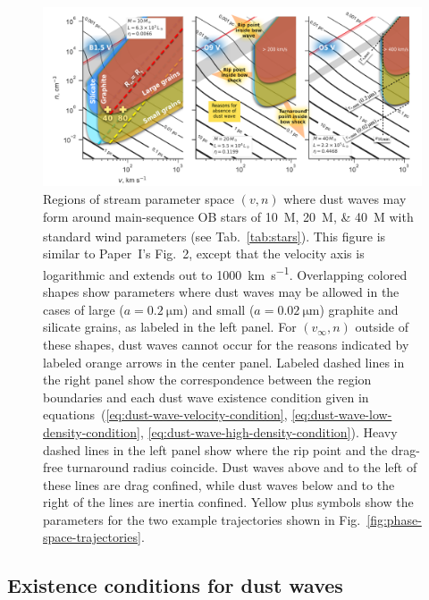 \begin{figure}
  \centering
  \includegraphics[width=\linewidth]{figs/existence-dust-wave}
  \caption{Regions of stream parameter space \((v, n)\) where dust
    waves may form around main-sequence OB stars of
    \SIlist{10;20;40}{M_\odot} with standard wind parameters (see
    Tab.~\ref{tab:stars}).  This figure is similar to Paper~I's
    Fig.~2, except that the velocity axis is logarithmic and extends
    out to \SI{1000}{km.s^{-1}}.  Overlapping colored shapes show
    parameters where dust waves may be allowed in the cases of large
    (\(a = \SI{0.2}{\um}\)) and small (\(a = \SI{0.02}{\um}\))
    graphite and silicate grains, as labeled in the left panel.  For
    \((v_\infty, n)\) outside of these shapes, dust waves cannot occur for
    the reasons indicated by labeled orange arrows in the center
    panel.  Labeled dashed lines in the right panel show the
    correspondence between the region boundaries and each dust wave
    existence condition given in
    equations~(\ref{eq:dust-wave-velocity-condition},
    \ref{eq:dust-wave-low-density-condition},
    \ref{eq:dust-wave-high-density-condition}). Heavy dashed lines in
    the left panel show where the rip point and the drag-free
    turnaround radius coincide.  Dust waves above and to the left of
    these lines are drag confined, while dust waves below and to the
    right of the lines are inertia confined.  Yellow plus symbols show
    the parameters for the two example trajectories shown in
    Fig.~\ref{fig:phase-space-trajectories}.}
  \label{fig:existence-dust-wave}
\end{figure}

\subsection{Existence conditions for dust waves}
\label{sec:exist-cond-separ}

